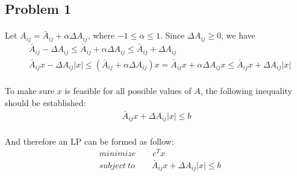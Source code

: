 \subsection*{Problem 1}
\paragraph{}
Let $A_{ij} = \bar{A}_{ij} +\alpha \Delta A_{ij} $, where $ -1 \leq \alpha \leq 1$. Since $ \Delta A_{ij} \geq 0$, we have
\begin{align*}
& \bar{A}_{ij} - \Delta A_{ij} \leq \bar{A}_{ij} + \alpha \Delta A_{ij} \leq \bar{A}_{ij} + \Delta A_{ij} \\
&\bar{A}_{ij}x - \Delta A_{ij}|x| \leq (\bar{A}_{ij} + \alpha \Delta A_{ij}) x = \bar{A}_{ij}x + \alpha \Delta A_{ij} x \leq \bar{A}_{ij}x + \Delta A_{ij}|x|
\end{align*}
\paragraph{}
To make sure $x$ is feasible for all possible values of $A$, the following inequality should be established:
\begin{align*}
\bar{A}_{ij}x + \Delta A_{ij}|x| \leq b
\end{align*}
\paragraph{}
And therefore an LP can be formed as follow: 
\begin{align*}
& minimize \qquad c^T x \\
& subject \ to \qquad \bar{A}_{ij}x + \Delta A_{ij}|x| \leq b
\end{align*}